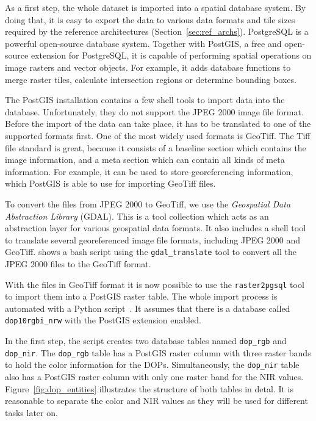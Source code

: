 As a first step, the whole dataset is imported into a spatial database system. By doing that, it is easy to export the data to various data formats and tile sizes required by the reference architectures (Section~\ref{sec:ref_archs}). PostgreSQL is a powerful open-source database system. Together with PostGIS, a free and open-source extension for PostgreSQL, it is capable of performing spatial operations on image rasters and vector objects. For example, it adds database functions to merge raster tiles, calculate intersection regions or determine bounding boxes.

The PostGIS installation contains a few shell tools to import data into the database. Unfortunately, they do not support the JPEG 2000 image file format. Before the import of the data can take place, it has to be translated to one of the supported formats first. One of the most widely used formats is GeoTiff. The Tiff file standard is great, because it consists of a baseline section which contains the image information, and a meta section which can contain all kinds of meta information. For example, it can be used to store georeferencing information, which PostGIS is able to use for importing GeoTiff files.

To convert the files from JPEG 2000 to GeoTiff, we use the \emph{Geospatial Data Abstraction Library} (GDAL). This is a tool collection which acts as an abstraction layer for various geospatial data formats. It also includes a shell tool to translate several georeferenced image file formats, including JPEG 2000 and GeoTiff. \cite[\texttt{jp2\_to\_tif.sh}]{thesis-code20} shows a bash script using the \texttt{gdal\_translate} tool to convert all the JPEG 2000 files to the GeoTiff format.

With the files in GeoTiff format it is now possible to use the \texttt{raster2pgsql} tool to import them into a PostGIS raster table. The whole import process is automated with a Python script~\cite[\texttt{tif\_to\_raster.py}]{thesis-code20}. It assumes that there is a database called \texttt{dop10rgbi\_nrw} with the PostGIS extension enabled.

In the first step, the script creates two database tables named \texttt{dop\_rgb} and \texttt{dop\_nir}. The \texttt{dop\_rgb} table has a PostGIS raster column with three raster bands to hold the color information for the DOPs. Simultaneously, the \texttt{dop\_nir} table also has a PostGIS raster column with only one raster band for the NIR values. Figure~\ref{fig:dop_entities} illustrates the structure of both tables in detal. It is reasonable to separate the color and NIR values as they will be used for different tasks later on.

